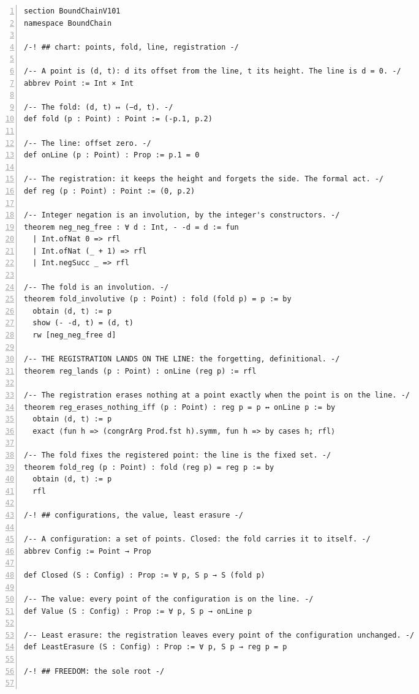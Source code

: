 \documentclass[10pt]{article}
\newcommand{\leansize}{\fontsize{5.5pt}{6.75pt}\selectfont}
\begin{document}
\begin{multicols}{2}
\begin{Verbatim}[numbers=left,firstnumber=1,numbersep=3pt,xleftmargin=2.6em,breaklines=true,breakanywhere=true,breakautoindent=false,breakindent=1.4em,breaksymbolleft={},breakanywheresymbolpre={},fontsize=\leansize]
section BoundChainV101
namespace BoundChain

/-! ## chart: points, fold, line, registration -/

/-- A point is (d, t): d its offset from the line, t its height. The line is d = 0. -/
abbrev Point := Int × Int

/-- The fold: (d, t) ↦ (−d, t). -/
def fold (p : Point) : Point := (-p.1, p.2)

/-- The line: offset zero. -/
def onLine (p : Point) : Prop := p.1 = 0

/-- The registration: it keeps the height and forgets the side. The formal act. -/
def reg (p : Point) : Point := (0, p.2)

/-- Integer negation is an involution, by the integer's constructors. -/
theorem neg_neg_free : ∀ d : Int, - -d = d := fun
  | Int.ofNat 0 => rfl
  | Int.ofNat (_ + 1) => rfl
  | Int.negSucc _ => rfl

/-- The fold is an involution. -/
theorem fold_involutive (p : Point) : fold (fold p) = p := by
  obtain ⟨d, t⟩ := p
  show (- -d, t) = (d, t)
  rw [neg_neg_free d]

/-- THE REGISTRATION LANDS ON THE LINE: the forgetting, definitional. -/
theorem reg_lands (p : Point) : onLine (reg p) := rfl

/-- The registration erases nothing at a point exactly when the point is on the line. -/
theorem reg_erases_nothing_iff (p : Point) : reg p = p ↔ onLine p := by
  obtain ⟨d, t⟩ := p
  exact ⟨fun h => (congrArg Prod.fst h).symm, fun h => by cases h; rfl⟩

/-- The fold fixes the registered point: the line is the fixed set. -/
theorem fold_reg (p : Point) : fold (reg p) = reg p := by
  obtain ⟨d, t⟩ := p
  rfl

/-! ## configurations, the value, least erasure -/

/-- A configuration: a set of points. Closed: the fold carries it to itself. -/
abbrev Config := Point → Prop

def Closed (S : Config) : Prop := ∀ p, S p → S (fold p)

/-- The value: every point of the configuration is on the line. -/
def Value (S : Config) : Prop := ∀ p, S p → onLine p

/-- Least erasure: the registration leaves every point of the configuration unchanged. -/
def LeastErasure (S : Config) : Prop := ∀ p, S p → reg p = p

/-! ## FREEDOM: the sole root -/


\end{Verbatim}
\end{multicols}
\end{document}
